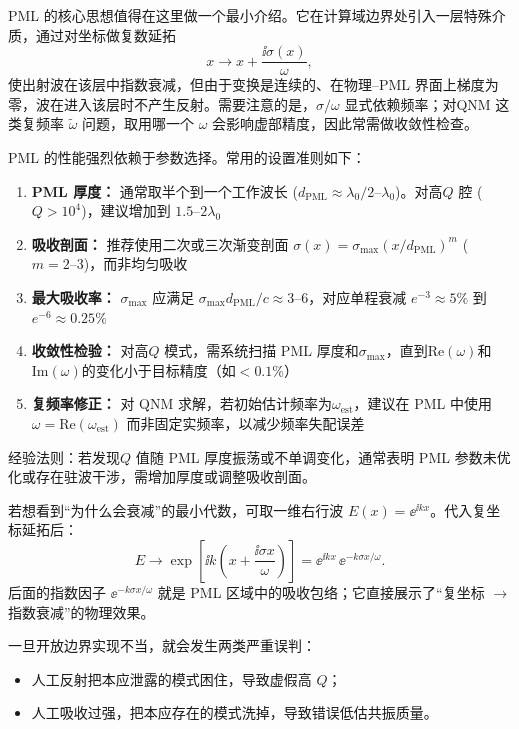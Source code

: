 PML 的核心思想值得在这里做一个最小介绍。它在计算域边界处引入一层特殊介质，通过对坐标做复数延拓
\[
x \to x + \frac{\ii\sigma(x)}{\omega},
\]
使出射波在该层中指数衰减，但由于变换是连续的、在物理--PML 界面上梯度为零，波在进入该层时不产生反射。需要注意的是，$\sigma/\omega$ 显式依赖频率；对QNM 这类复频率 $\tilde{\omega}$ 问题，取用哪一个 $\omega$ 会影响虚部精度，因此常需做收敛性检查。
\begin{WarningBox}
PML 的性能强烈依赖于参数选择。常用的设置准则如下：
\begin{enumerate}
  \item \textbf{PML 厚度：} 通常取半个到一个工作波长 ($d_{\mathrm{PML}} \approx \lambda_0/2 \text{--} \lambda_0$)。对高$Q$ 腔 ($Q>10^4$)，建议增加到 $1.5\text{--}2\lambda_0$
  \item \textbf{吸收剖面：} 推荐使用二次或三次渐变剖面 $\sigma(x) = \sigma_{\max}(x/d_{\mathrm{PML}})^m$ ($m=2\text{--}3$)，而非均匀吸收
  \item \textbf{最大吸收率：} $\sigma_{\max}$ 应满足 $\sigma_{\max} d_{\mathrm{PML}}/c \approx 3\text{--}6$，对应单程衰减 $e^{-3}\approx 5\%$ 到 $e^{-6}\approx 0.25\%$
  \item \textbf{收敛性检验：} 对高$Q$ 模式，需系统扫描 PML 厚度和$\sigma_{\max}$，直到$\mathrm{Re}(\omega)$和$\mathrm{Im}(\omega)$的变化小于目标精度（如$<0.1\%$）
  \item \textbf{复频率修正：} 对 QNM 求解，若初始估计频率为$\omega_{\mathrm{est}}$，建议在 PML 中使用$\omega = \mathrm{Re}(\omega_{\mathrm{est}})$ 而非固定实频率，以减少频率失配误差
\end{enumerate}
经验法则：若发现$Q$ 值随 PML 厚度振荡或不单调变化，通常表明 PML 参数未优化或存在驻波干涉，需增加厚度或调整吸收剖面。
\end{WarningBox}
若想看到“为什么会衰减”的最小代数，可取一维右行波 $E(x)=\ee^{\ii kx}$。代入复坐标延拓后：
\[
E \to \exp\!\left[\ii k\!\left(x+\frac{\ii\sigma x}{\omega}\right)\right]
=
\ee^{\ii kx}\,\ee^{-k\sigma x/\omega}.
\]
后面的指数因子 $\ee^{-k\sigma x/\omega}$ 就是 PML 区域中的吸收包络；它直接展示了“复坐标 $\rightarrow$ 指数衰减”的物理效果。

一旦开放边界实现不当，就会发生两类严重误判：
\begin{itemize}
  \item 人工反射把本应泄露的模式困住，导致虚假高 $Q$；
  \item 人工吸收过强，把本应存在的模式洗掉，导致错误低估共振质量。
\end{itemize}

